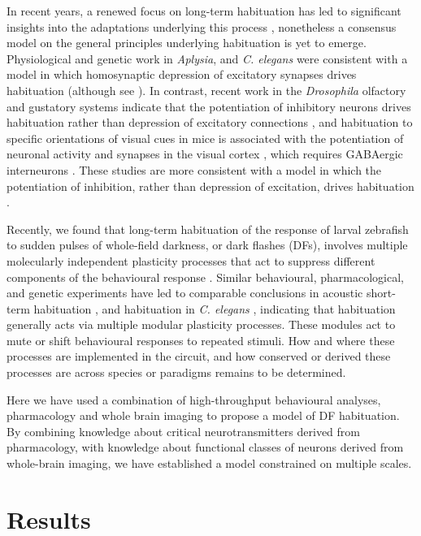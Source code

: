 \documentclass[9pt,lineno]{RandlettLab_elife}
\begin{document}
In recent years, a renewed focus on long-term habituation has led to significant insights into the adaptations underlying this process \cite{Cooke2020-mz, McDiarmid2019-mh}, nonetheless a consensus model on the general principles underlying habituation is yet to emerge.  Physiological and genetic work in \emph{Aplysia}, and \emph{C. elegans} were consistent with a model in which homosynaptic depression of excitatory synapses drives habituation \cite{Bailey1983-ei, Rose2003-dl} (although see \cite{Glanzman2009-tz}). In contrast, recent work in the \emph{Drosophila} olfactory and gustatory systems indicate that the potentiation of inhibitory neurons drives habituation rather than depression of excitatory connections \cite{Das2011-gd, Paranjpe2012-ce, Trisal2022-pa},  and habituation to specific orientations of visual cues in mice is associated with the potentiation of neuronal activity and synapses in the visual cortex \cite{Cooke2015-qs}, which requires GABAergic interneurons \cite{Kaplan2016-qk}. These studies are more consistent with a model in which the potentiation of inhibition, rather than depression of excitation, drives habituation \cite{Cooke2020-mz}. 

Recently, we found that long-term habituation of the response of larval zebrafish to sudden pulses of whole-field darkness, or dark flashes (DFs), involves multiple molecularly independent plasticity processes that act to suppress different components of the behavioural response \cite{Randlett2019-fi}. Similar behavioural, pharmacological, and genetic experiments have led to comparable conclusions in acoustic short-term habituation \cite{Nelson2022-qr}, and habituation in \emph{C. elegans} \cite{McDiarmid2019-lo, McDiarmid2019-mh}, indicating that habituation generally acts via multiple modular plasticity processes. These modules act to mute or shift behavioural responses to repeated stimuli. How and where these processes are implemented in the circuit, and how conserved or derived these processes are across species or paradigms remains to be determined. 

Here we have used a combination of high-throughput behavioural analyses, pharmacology and whole brain imaging to propose a model of DF habituation. By combining knowledge about critical neurotransmitters derived from pharmacology, with knowledge about functional classes of neurons derived from whole-brain imaging, we have established a model constrained on multiple scales.


\section{Results}
\end{document}
